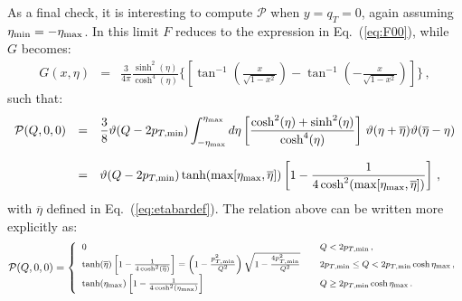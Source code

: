 \documentclass[10pt,a4paper]{article}
\begin{document}
As a final check, it is interesting to compute $\mathcal{P}$ when
$y=q_T=0$, again assuming $\eta_{\rm min} = -\eta_{\rm max}$. In this
limit $F$ reduces to the expression in Eq.~(\ref{eq:F00}), while $G$
becomes:
\begin{equation}
\begin{array}{rcl}
\displaystyle G(x ,\eta)&=&\displaystyle 
                            \frac{3}{4\pi }\frac{\sinh^2(\eta)}{\cosh^4(\eta)}
                            \Bigg\{\left[\tan^{-1}\left(\frac{
      x}{\sqrt{1-x^2}}\right)-\tan^{-1}\left(-\frac{
      x}{\sqrt{1-x^2}}\right)\right]
\Bigg\}\,,
\end{array}
\end{equation}
such that:
\begin{equation}
\begin{array}{rcl}
  \mathcal{P}(Q,0,0)&=&\displaystyle\frac38\vartheta(Q- 2p_{T,\rm min})\displaystyle \int_{-\eta_{\rm
      max}}^{\eta_{\rm
      max}}d\eta\left[\frac{\cosh^2(\eta)+\sinh^2(\eta)}{\cosh^4(\eta)}\right]\,\vartheta(\eta+\overline{\eta})
  \vartheta(\overline{\eta}-\eta)\\
\\
&=&\displaystyle\vartheta(Q- 2p_{T,\rm
    min})\tanh(\mbox{max}[\eta_{\rm max},\overline{\eta}])\left[1-\frac{1}{4\cosh^2(\mbox{max}[\eta_{\rm max},\overline{\eta}])}\right]\,,
\end{array}
\end{equation}
with $\overline{\eta}$ defined in Eq.~(\ref{eq:etabardef}). The
relation above can be written more explicitly as:
\begin{equation}\label{eq:partcase2}
{\footnotesize
\mathcal{P}(Q,0,0) = 
\left\{
\begin{array}{ll}
0 & \quad Q< 2p_{T,\rm min}\,,\\
 \tanh(\overline{\eta})\left[1-\frac{1}{4\cosh^2(\overline{\eta})}\right]=\left(1-\frac{p_{T,\rm min}^2}{Q^2}\right)\sqrt{1-\frac{4 p_{T,\rm min}^2}{Q^2}}& \quad 2p_{T,\rm min} \leq Q < 2p_{T,\rm min}\cosh\eta_{\rm max}\,,\\
 \tanh(\eta_{\rm max})\left[1-\frac{1}{4\cosh^2(\eta_{\rm max})}\right] & \quad Q \geq 2p_{T,\rm min}\cosh\eta_{\rm max}\,.
\end{array}
\right.}
\end{equation}
\end{document}

